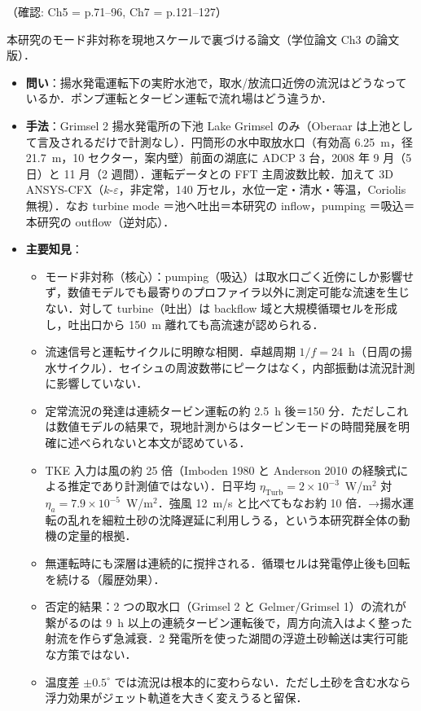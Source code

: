\documentclass[11pt]{jsarticle}
\newcommand{\litref}[1]{{\large\bfseries\color{citecolor}#1}}
\begin{document}
\noindent（確認: Ch5 = p.71--96, Ch7 = p.121--127）

\noindent\litref{M\"uller et al. (2018)}\quad 本研究のモード非対称を現地スケールで裏づける論文（学位論文 Ch3 の論文版）．
\begin{itemize}
  \item \textbf{問い}：揚水発電運転下の実貯水池で，取水/放流口近傍の流況はどうなっているか．ポンプ運転とタービン運転で流れ場はどう違うか．
  \item \textbf{手法}：Grimsel 2 揚水発電所の下池 Lake Grimsel のみ（Oberaar は上池として言及されるだけで計測なし）．円筒形の水中取放水口（有効高 6.25~m，径 21.7~m，10 セクター，案内壁）前面の湖底に ADCP 3 台，2008 年 9 月（5 日）と 11 月（2 週間）．運転データとの FFT 主周波数比較．加えて 3D ANSYS-CFX（$k$-$\varepsilon$，非定常，140 万セル，水位一定・清水・等温，Coriolis 無視）．なお turbine mode ＝池へ吐出＝本研究の inflow，pumping ＝吸込＝本研究の outflow（逆対応）．
  \item \textbf{主要知見}：
  \begin{itemize}
    \item モード非対称（核心）：pumping（吸込）は取水口ごく近傍にしか影響せず，数値モデルでも最寄りのプロファイラ以外に測定可能な流速を生じない．対して turbine（吐出）は backflow 域と大規模循環セルを形成し，吐出口から 150~m 離れても高流速が認められる．
    \item 流速信号と運転サイクルに明瞭な相関．卓越周期 $1/f = 24$~h（日周の揚水サイクル）．セイシュの周波数帯にピークはなく，内部振動は流況計測に影響していない．
    \item 定常流況の発達は連続タービン運転の約 2.5~h 後＝150 分．ただしこれは数値モデルの結果で，現地計測からはタービンモードの時間発展を明確に述べられないと本文が認めている．
    \item TKE 入力は風の約 25 倍（Imboden 1980 と Anderson 2010 の経験式による推定であり計測値ではない）．日平均 $\eta_\mathrm{Turb} = 2\times10^{-3}$~W/m$^2$ 対 $\eta_a = 7.9\times10^{-5}$~W/m$^2$．強風 12~m/s と比べてもなお約 10 倍．→揚水運転の乱れを細粒土砂の沈降遅延に利用しうる，という本研究群全体の動機の定量的根拠．
    \item 無運転時にも深層は連続的に撹拌される．循環セルは発電停止後も回転を続ける（履歴効果）．
    \item 否定的結果：2 つの取水口（Grimsel 2 と Gelmer/Grimsel 1）の流れが繋がるのは 9~h 以上の連続タービン運転後で，周方向流入はよく整った射流を作らず急減衰．2 発電所を使った湖間の浮遊土砂輸送は実行可能な方策ではない．
    \item 温度差 $\pm 0.5^\circ$ では流況は根本的に変わらない．ただし土砂を含む水なら浮力効果がジェット軌道を大きく変えうると留保．

\end{itemize}
\end{itemize}
\end{document}
